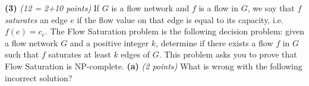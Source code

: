 \documentclass[11pt]{article}
\def\gap{0.1in}
\begin{document}
\setlength{\parindent}{0in}
\addtolength{\parskip}{0.1cm}
\setlength{\fboxrule}{.5mm}\setlength{\fboxsep}{1.2mm}
\newlength{\boxlength}\setlength{\boxlength}{\textwidth}
\addtolength{\boxlength}{-4mm}
\begin{center}
\end{center}
\vspace{5mm}

{\bf (3)} {\em (12 = 2+10 points)}
If $G$ is a flow network and $f$ is a flow in $G$, 
we say that $f$ \emph{saturates} an edge $e$ if the flow value 
on that edge is equal to its capacity, i.e. $f(e) = c_e$. 
The {\sc Flow Saturation} problem is the following 
decision problem: given a flow network $G$ and a positive integer 
$k$, determine if there exists a flow $f$ in $G$ such that 
$f$ saturates at least $k$ edges of $G$.
This problem asks you to prove that {\sc Flow Saturation} is NP-complete.
\vskip \gap
{\bf (a)} {\em (2 points)}
What is wrong with the following incorrect solution?
\end{document}
